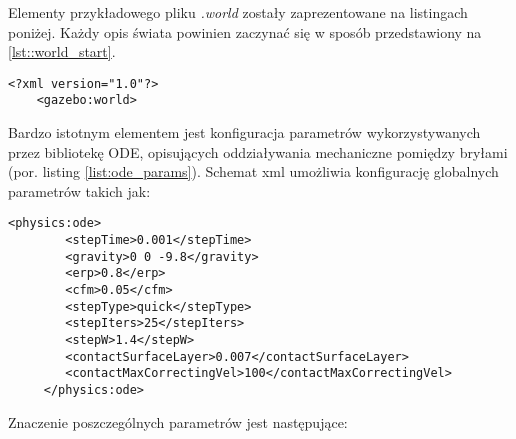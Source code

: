 	Elementy przykładowego pliku \textit{.world} zostały zaprezentowane na listingach poniżej. Każdy opis świata powinien zaczynać się w sposób przedstawiony na \ref{lst::world_start}.
	\begin{lstlisting}[name=gazebo_simple_world,caption=Nagłówek pliku opisującego świat. \label{lst::world_start}]
	<?xml version="1.0"?>
	<gazebo:world>
	\end{lstlisting}
	Bardzo istotnym elementem jest konfiguracja parametrów wykorzystywanych przez bibliotekę ODE, opisujących oddziaływania mechaniczne pomiędzy bryłami (por. listing \ref{list:ode_params}). Schemat xml umożliwia konfigurację globalnych parametrów takich jak:
	\begin{lstlisting}[name=gazebo_simple_world,caption=Parametry symulacji. \label{list:ode_params}]
	<physics:ode>
		<stepTime>0.001</stepTime>
		<gravity>0 0 -9.8</gravity>		
		<erp>0.8</erp>
		<cfm>0.05</cfm>
		<stepType>quick</stepType>
		<stepIters>25</stepIters>
		<stepW>1.4</stepW>
		<contactSurfaceLayer>0.007</contactSurfaceLayer>
		<contactMaxCorrectingVel>100</contactMaxCorrectingVel>
	 </physics:ode>
	\end{lstlisting}
	Znaczenie poszczególnych parametrów jest następujące:

